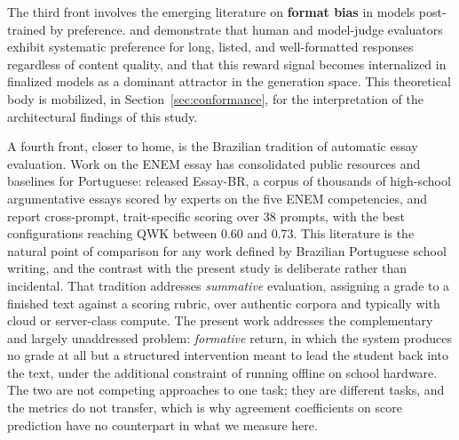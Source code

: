 \documentclass{sbc2023}%
\begin{document}
The third front involves the emerging literature on \textbf{format bias} in models post-trained by preference. \citet{zheng2023judging} and \citet{wu2023style} demonstrate that human and model-judge evaluators exhibit systematic preference for long, listed, and well-formatted responses regardless of content quality, and that this reward signal becomes internalized in finalized models as a dominant attractor in the generation space. This theoretical body is mobilized, in Section~\ref{sec:conformance}, for the interpretation of the architectural findings of this study.

A fourth front, closer to home, is the Brazilian tradition of automatic essay evaluation. Work on the ENEM essay has consolidated public resources and baselines for Portuguese: \citet{marinho2022essaybr} released Essay-BR, a corpus of thousands of high-school argumentative essays scored by experts on the five ENEM competencies, and \citet{barbosa2026aesenem} report cross-prompt, trait-specific scoring over 38 prompts, with the best configurations reaching QWK between 0.60 and 0.73. This literature is the natural point of comparison for any work defined by Brazilian Portuguese school writing, and the contrast with the present study is deliberate rather than incidental. That tradition addresses \textit{summative} evaluation, assigning a grade to a finished text against a scoring rubric, over authentic corpora and typically with cloud or server-class compute. The present work addresses the complementary and largely unaddressed problem: \textit{formative} return, in which the system produces no grade at all but a structured intervention meant to lead the student back into the text, under the additional constraint of running offline on school hardware. The two are not competing approaches to one task; they are different tasks, and the metrics do not transfer, which is why agreement coefficients on score prediction have no counterpart in what we measure here.
\end{document}
